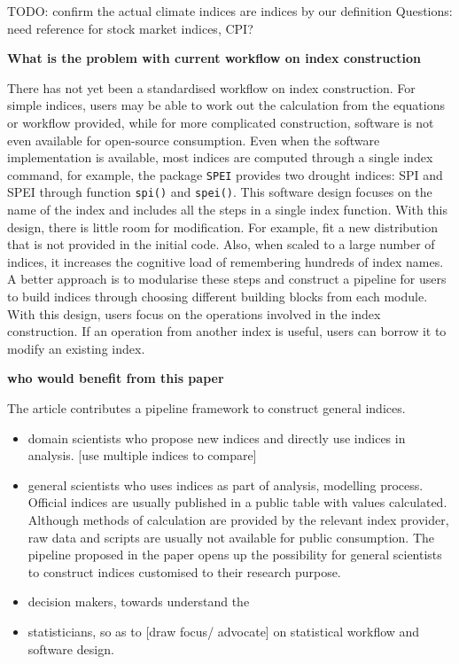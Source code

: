 \documentclass[
]{article}
\providecommand{\tightlist}{%
  \setlength{\itemsep}{0pt}\setlength{\parskip}{0pt}}\usepackage{longtable,booktabs,array}
\begin{document}
TODO: confirm the actual climate indices are indices by our definition
Questions: need reference for stock market indices, CPI?

\textbf{What is the problem with current workflow on index construction}

There has not yet been a standardised workflow on index construction.
For simple indices, users may be able to work out the calculation from
the equations or workflow provided, while for more complicated
construction, software is not even available for open-source
consumption. Even when the software implementation is available, most
indices are computed through a single index command, for example, the
package \texttt{SPEI} provides two drought indices: SPI and SPEI through
function \texttt{spi()} and \texttt{spei()}. This software design
focuses on the name of the index and includes all the steps in a single
index function. With this design, there is little room for modification.
For example, fit a new distribution that is not provided in the initial
code. Also, when scaled to a large number of indices, it increases the
cognitive load of remembering hundreds of index names. A better approach
is to modularise these steps and construct a pipeline for users to build
indices through choosing different building blocks from each module.
With this design, users focus on the operations involved in the index
construction. If an operation from another index is useful, users can
borrow it to modify an existing index.

\textbf{who would benefit from this paper}

The article contributes a pipeline framework to construct general
indices.

\begin{itemize}
\tightlist
\item
  domain scientists who propose new indices and directly use indices in
  analysis. {[}use multiple indices to compare{]}
\item
  general scientists who uses indices as part of analysis, modelling
  process. Official indices are usually published in a public table with
  values calculated. Although methods of calculation are provided by the
  relevant index provider, raw data and scripts are usually not
  available for public consumption. The pipeline proposed in the paper
  opens up the possibility for general scientists to construct indices
  customised to their research purpose.
\item
  decision makers, towards understand the
\item
  statisticians, so as to {[}draw focus/ advocate{]} on statistical
  workflow and software design.
\end{itemize}
\end{document}
